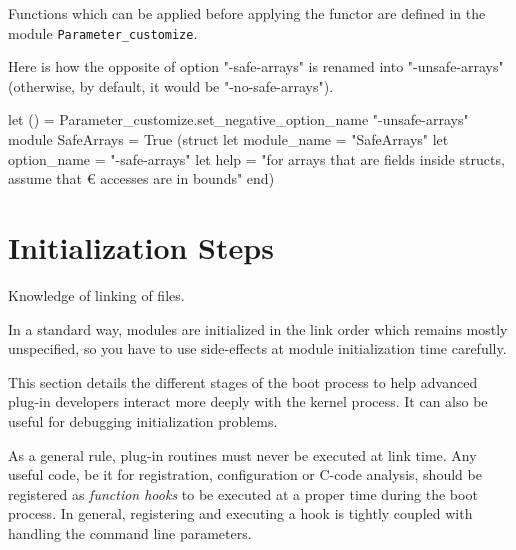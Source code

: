 Functions which can be applied before applying the functor are defined in the
module \texttt{Parameter\_customize}.
\begin{example}
Here is how the opposite of option "-safe-arrays" is renamed into
"-unsafe-arrays" (otherwise, by default, it would be "-no-safe-arrays").
\begin{ocamlcode}
let () = Parameter_customize.set_negative_option_name "-unsafe-arrays"
module SafeArrays =
  True
    (struct
       let module_name = "SafeArrays"
       let option_name = "-safe-arrays"
       let help = "for arrays that are fields inside structs, assume that €
                   accesses are in bounds"
     end)
\end{ocamlcode}
\end{example}


\section{Initialization Steps}\label{adv:init}

\begin{prereq}
  Knowledge of linking of \caml files.
\end{prereq}

\begin{important}
  In a standard way, \framac modules are initialized in the link
  order which remains mostly unspecified, so you have to use
  side-effects at module initialization time carefully.
\end{important}

This section details the different stages of the \framac boot process
to help advanced plug-in developers interact more deeply with
the kernel process. It can also be useful for debugging initialization
problems.

As a general rule, plug-in routines must never be executed at link time. Any
useful code, be it for registration, configuration or \textsf{C}-code analysis,
should be registered as \emph{function hooks} to be executed at a proper time
during the \framac boot process. In general, registering and executing a hook is
tightly coupled with handling the command line parameters.

